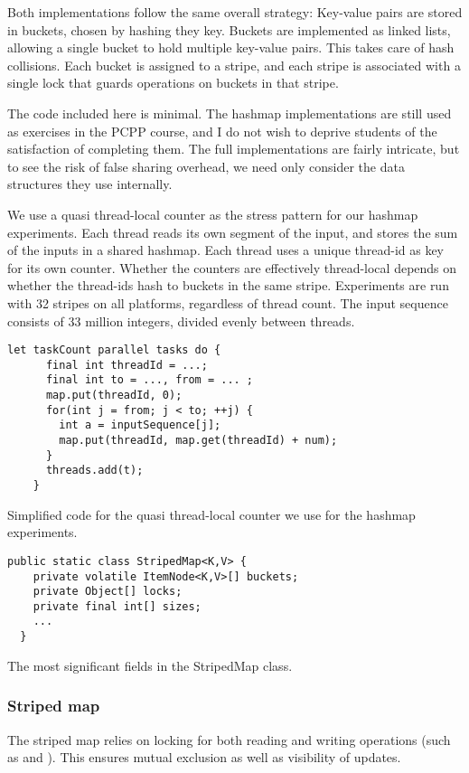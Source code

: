 Both implementations follow the same overall strategy: Key-value pairs are
stored in buckets, chosen by hashing they key. Buckets are implemented as linked
lists, allowing a single bucket to hold multiple key-value pairs. This
takes care of hash collisions. Each bucket is assigned to a stripe, and each
stripe is associated with a single lock that guards operations on buckets in
that stripe.

The code included here is minimal. The hashmap implementations are still used as
exercises in the PCPP course, and I do not wish to deprive students of the
satisfaction of completing them. The full implementations are fairly intricate,
but to see the risk of false sharing overhead, we need only consider the data
structures they use internally.

We use a quasi thread-local counter as the stress pattern for our hashmap
experiments. Each thread reads its own segment of the input, and stores the sum
of the inputs in a shared hashmap. Each thread uses a unique thread-id as key
for its own counter. Whether the counters are effectively thread-local depends
on whether the thread-ids hash to buckets in the same stripe.
Experiments are run with 32 stripes on all platforms, regardless of thread
count. The input sequence consists of 33 million integers, divided evenly
between threads.

\begin{code}
\begin{Verbatim}[frame=single]
  let taskCount parallel tasks do {
      final int threadId = ...;
      final int to = ..., from = ... ;
      map.put(threadId, 0);
      for(int j = from; j < to; ++j) {
        int a = inputSequence[j];
        map.put(threadId, map.get(threadId) + num);
      }
      threads.add(t);
    }
\end{Verbatim}
	\caption{Simplified code for the quasi thread-local counter we use for
	the hashmap experiments.}
\end{code}

\begin{code}
\begin{Verbatim}[frame=single]
  public static class StripedMap<K,V> {
    private volatile ItemNode<K,V>[] buckets;
    private Object[] locks;
    private final int[] sizes;
    ...
  }
\end{Verbatim}
	\caption{The most significant fields in the StripedMap class.}
\end{code}

\subsubsection{Striped map}
The striped map relies on locking for both reading and writing operations (such
as  and ). This ensures mutual exclusion as well as
visibility of updates.

